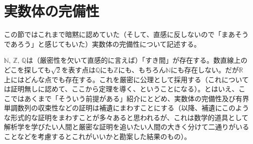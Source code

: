 \clearpage
\section{実数体の完備性}
この節ではこれまで暗黙に認めていた（そして、直感に反しないので「まあそうであろう」と感じてもいた）実数体の完備性について記述する。

$\mathbb{N},\,\mathbb{Z},\,\mathbb{Q}$は（厳密性を欠いて直感的に言えば）「すき間」が存在する。数直線上のどこを探しても$\sqrt{2}$を表す点は$\mathbb{Q}$にも$\mathbb{Z}$にも、もちろん$\mathbb{N}$にも存在しない。だが$\mathbb{R}$上にはどんな点でも存在する。これを厳密に公理として採用する（これについては証明無しに認めて、ここから定理を導く、ということになる）。とはいえ、ここではあくまで「そういう前提がある」紹介にとどめ、実数体の完備性及び有界単調数列の収束性などの証明は補遺にまわすことにする（以降、補遺にこのような形式的な証明をまわすことが多々あると思われるが、これは数学的道具として解析学を学びたい人間と厳密な証明を追いたい人間の大きく分けて二通りがいることなどを考慮するとこれがいいかと勘案した結果のもの）。